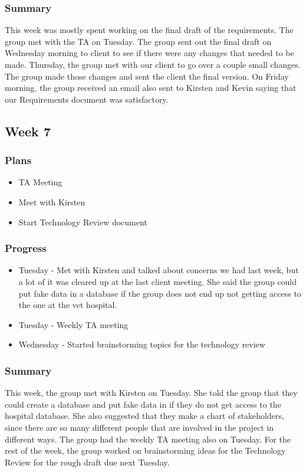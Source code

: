 \documentclass[onecolumn, draftclsnofoot,10pt, compsoc]{IEEEtran}
\begin{document}
\subsubsection{Summary}
This week was mostly spent working on the final draft of the requirements. The group met with the TA on Tuesday. The group sent out the final draft on Wednesday morning to client to see if there were any changes that needed to be made. Thursday, the group met with our client to go over a couple small changes. The group made those changes and sent the client the final version. On Friday morning, the group received an email also sent to Kirsten and Kevin saying that our Requirements document was satisfactory. 
\subsection{Week 7}

\subsubsection{Plans}
\begin{itemize}
\item TA Meeting
\item Meet with Kirsten
\item Start Technology Review document

\end{itemize}

\subsubsection{Progress}
\begin{itemize}
\item Tuesday - Met with Kirsten and talked about concerns we had last week, but a lot of it was cleared up at the last client meeting. She said the group could put fake data in a database if the group does not end up not getting access to the one at the vet hospital.
\item Tuesday - Weekly TA meeting
\item Wednesday - Started brainstorming topics for the technology review

\end{itemize}
\subsubsection{Summary}
This week, the group met with Kirsten on Tuesday. She told the group that they could create a database and put fake data in if they do not get access to the hospital database. She also suggested that they make a chart of stakeholders, since there are so many different people that are involved in the project in different ways. The group had the weekly TA meeting also on Tuesday. For the rest of the week, the group worked on brainstorming ideas for the Technology Review for the rough draft due next Tuesday.
\end{document}
